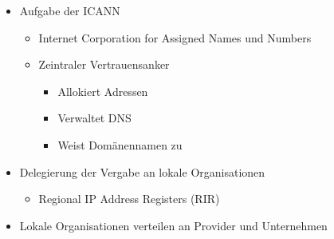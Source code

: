       \begin{itemize}
        \item Aufgabe der ICANN
          \begin{itemize}
            \item Internet Corporation for Assigned Names und Numbers
            \item Zeintraler Vertrauensanker
              \begin{itemize}
                \item Allokiert Adressen
                \item Verwaltet DNS
                \item Weist Domänennamen zu
              \end{itemize}
          \end{itemize}
        \item Delegierung der Vergabe an lokale Organisationen
          \begin{itemize}
            \item Regional IP Address Registers (RIR)
          \end{itemize}
        \item Lokale Organisationen verteilen an Provider und Unternehmen
      \end{itemize}
